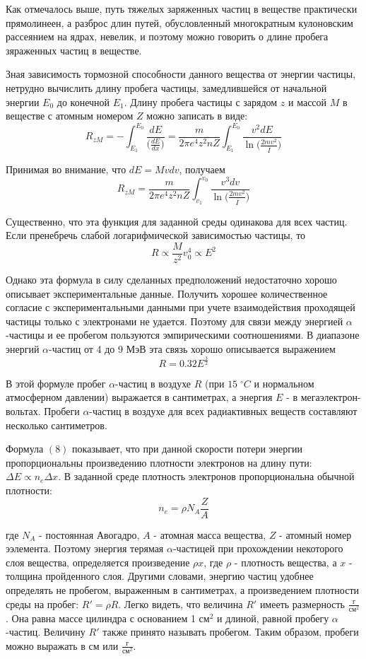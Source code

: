 \documentclass[a4paper,14pt]{extarticle}
\begin{document}
Как отмечалось выше, путь тяжелых заряженных частиц в веществе практически прямолинеен, а разброс длин путей, обусловленный многократным кулоновским рассеянием на ядрах, невелик, и поэтому можно говорить о длине пробега зяраженных частиц в веществе.

Зная зависимость тормозной способности данного вещества от энергии частицы, нетрудно вычислить длину пробега частицы, замедлившейся от начальной энергии $E_0$ до конечной $E_1$. Длину пробега частицы с зарядом $z$ и массой $M$ в веществе с атомным номером $Z$ можно записать в виде:
$$R_{zM}=-\int_{E_1}^{E_0}\frac{dE}{\big(\frac{dE}{dx}\big)}=\frac{m}{2\pi e^4z^2nZ}\int_{E_1}^{E_0}\frac{v^2dE}{\ln{\big(\frac{2mv^2}{\overline{I}}\big)}} $$

Принимая во внимание, что $dE=Mvdv$, получаем
$$R_{zM}=\frac{m}{2\pi e^4z^2nZ}\int_{v_1}^{v_0}\frac{v^3dv}{\ln{\big(\frac{2mv^2}{\overline{I}}\big)}} $$

Существенно, что эта функция для заданной среды одинакова для всех частиц. Если пренебречь слабой логарифмической зависимостью частицы, то
$$R \propto \frac{M}{z^2}v^4_0 \propto E^2 $$

Однако эта формула в силу сделанных предположений недостаточно хорошо описывает экспериментальные данные. Получить хорошее количественное согласие с экспериментальными данными при учете взаимодействия проходящей частицы только с электронами не удается. Поэтому для связи между энергией $\alpha$-частицы и ее пробегом пользуются эмпирическими соотношениями. В диапазоне энергий $\alpha$-частиц от 4 до 9 МэВ эта связь хорошо описывается выражением
$$R=0.32E^{\frac{3}{2}} $$

В этой формуле пробег $\alpha$-частиц в воздухе $R$ (при $15 \; ^\circ C$ и нормальном атмосферном давлении) выражается в сантиметрах, а энергия $E$ - в мегаэлектрон-вольтах. Пробеги $\alpha$-частиц в воздухе для всех радиактивных веществ составляют несколько сантиметров.

Формула $(8)$ показывает, что при данной скорости потери энергии пропорциональны произведению плотности электронов на длину пути: $\Delta E \propto n_e \Delta x$. В заданной среде плотность электронов пропорциональна обычной плотности:
$$n_e=\rho N_A \frac{Z}{A} $$
 
где $N_A$ - постоянная Авогадро, $A$ - атомная масса вещества, $Z$ - атомный номер ээлемента. Поэтому энергия терямая $\alpha$-частицей при прохождении некоторого слоя вещества, определяется произведение $\rho x$, где $\rho$ - плотность вещества, а $x$ - толщина пройденного слоя. Другими словами, энергию частиц удобнее определять не пробегом, выраженным в сантиметрах, а произведением плотности среды на пробег: $R'=\rho R$. Легко видеть, что величина $R'$ имееть размерность $\frac{г}{см^2}$. Она равна массе цилиндра с основанием 1 $см^2$ и длиной, равной пробегу $\alpha$-частиц. Величину $R'$ также принято называть пробегом. Таким образом, пробеги можно выражать в см или $\frac{г}{см^2}$.
\end{document}
